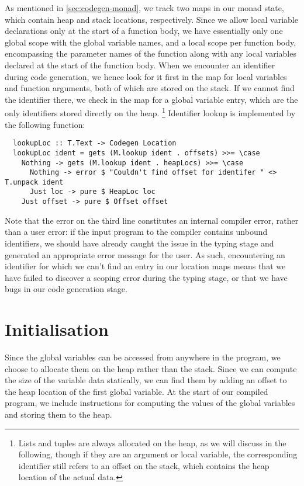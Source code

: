 As mentioned in \cref{sec:codegen-monad}, we track two maps in our
 monad state, which contain heap and stack locations,
respectively.
Since we allow local variable declarations only at the start of a function body,
we have essentially only one global scope with the global variable names,
and a local scope per function body, encompassing the parameter names of the
function along with any local variables declared at the start of the function
body.
When we encounter an identifier during code generation, we hence look for it
first in the  map for local variables and function arguments,
both of which are stored on the stack. If we cannot find the identifier there,
we check in the  map for a global variable entry, which are
the only identifiers stored directly on the heap.%
\footnote{Lists and tuples are always allocated on the heap, as we will discuss
in the following, though if they are an argument or local variable, the
corresponding identifier still refers to an offset on the stack, which contains
the heap location of the actual data.}
Identifier lookup is implemented by the following function:
%
\begin{verbatim}
  lookupLoc :: T.Text -> Codegen Location
  lookupLoc ident = gets (M.lookup ident . offsets) >>= \case
    Nothing -> gets (M.lookup ident . heapLocs) >>= \case
      Nothing -> error $ "Couldn't find offset for identifer " <> T.unpack ident
      Just loc -> pure $ HeapLoc loc
    Just offset -> pure $ Offset offset
\end{verbatim}
%
Note that the error on the third line constitutes an internal compiler error,
rather than a user error: if the input program to the compiler contains unbound
identifiers, we should have already caught the issue in the typing stage and
generated an appropriate error message for the user.
As such, encountering an identifier for which we can't find an entry in our
location maps means that we have failed to discover a scoping error during the
typing stage, or that we have bugs in our code generation stage.



\section{Initialisation} \label{sec:codegen-initialisation}

Since the global variables can be accessed from anywhere in the program, we
choose to allocate them on the heap rather than the stack. Since we can compute
the size of the variable data statically, we can find them by adding an offset
to the heap location of the first global variable.
At the start of our compiled program, we include instructions for computing the
values of the global variables and storing them to the heap.

